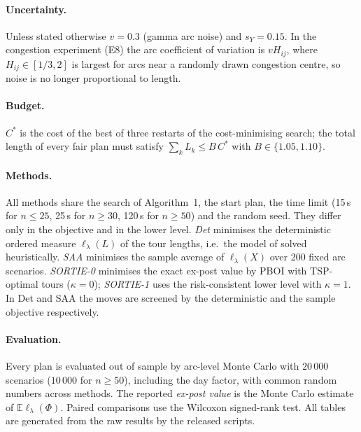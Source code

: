 \documentclass[11pt]{article}
\newcommand{\E}{\mathbb{E}}
\newcommand{\lord}{\ell_\lambda}
\begin{document}
\paragraph{Uncertainty.} Unless stated otherwise $v=0.3$ (gamma arc noise) and
$s_Y=0.15$. In the congestion experiment (E8) the arc coefficient of variation
is $vH_{ij}$, where $H_{ij}\in[1/3,2]$ is largest for arcs near a randomly
drawn congestion centre, so noise is no longer proportional to length.

\paragraph{Budget.} $C^\ast$ is the cost of the best of three restarts of
the cost-minimising search; the total length of every fair plan must satisfy
$\sum_k L_k\le B\,C^\ast$ with $B\in\{1.05,1.10\}$.

\paragraph{Methods.} All methods share the search of Algorithm~1,
the start plan, the time limit (15\,s for $n\le25$, 25\,s for $n\ge30$, 120\,s
for $n\ge50$) and the random seed. They differ only in the objective and in the
lower level.
\emph{Det} minimises the deterministic ordered measure $\lord(L)$ of the tour
lengths, i.e.\ the model of \citet{ljubic2026fair} solved heuristically.
\emph{SAA} minimises the sample average of $\lord(X)$ over 200 fixed arc
scenarios. \emph{SORTIE-0} minimises the exact ex-post value by PBOI with
TSP-optimal tours ($\kappa=0$); \emph{SORTIE-1} uses the risk-consistent lower
level with $\kappa=1$. In Det and SAA the moves are screened by the
deterministic and the sample objective respectively.

\paragraph{Evaluation.} Every plan is evaluated out of sample by arc-level
Monte Carlo with $20\,000$ scenarios ($10\,000$ for $n\ge 50$), including the
day factor, with common random numbers across methods. The reported
\emph{ex-post value} is the Monte Carlo estimate of $\E\lord(\Phi)$. Paired
comparisons use the Wilcoxon signed-rank test. All tables are generated from
the raw results by the released scripts.
\end{document}
